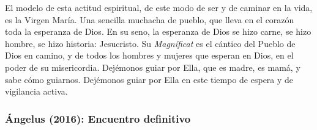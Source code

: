 \begin{body}
	El modelo de esta actitud espiritual, de este modo de ser y de caminar en la vida, es la Virgen María. Una sencilla muchacha de pueblo, que lleva en el corazón toda la esperanza de Dios. En su seno, la esperanza de Dios se hizo carne, se hizo hombre, se hizo historia: Jesucristo. Su \emph{Magníficat} es el cántico del Pueblo de Dios en camino, y de todos los hombres y mujeres que esperan en Dios, en el poder de su misericordia. Dejémonos guiar por Ella, que es madre, es mamá, y sabe cómo guiarnos. Dejémonos guiar por Ella en este tiempo de espera y de vigilancia activa.
\end{body}

\newpage
\subsubsection{Ángelus (2016): Encuentro definitivo}



